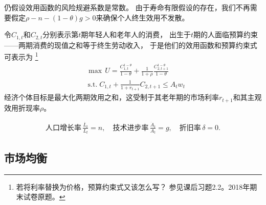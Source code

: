 \documentclass[cn,normal,11pt,black]{elegantnote}
\begin{document}
\begin{definition}[个人效用函数]
    仍假设效用函数的风险规避系数是常数。
    由于寿命有限假设的存在，我们不再需要假定$\rho - n - (1-\theta)g > 0$来确保个人终生效用不发散。
    
    令$C_{1,t}$和$C_{2,t}$分别表示第$t$期年轻人和老年人的消费，
    出生于$t$期的人面临预算约束——两期消费的现值之和等于终生劳动收入，
    于是他们的效用函数和预算约束式可表示为
    \footnote{若将利率替换为价格，预算约束式又该怎么写？ 参见课后习题2.2。2018年期末试卷原题。}
    \begin{align}
        & \max \, U = \frac{C_{1,t}^{1-\theta}}{1-\theta} + \frac{1}{1+\rho} \frac{C_{2, t+1}^{1-\theta}}{1-\theta}  \\ 
        & \, \mathrm{s.t.} \;  C_{1,t} + \frac{1}{1+r_{t+1}} C_{2,t+1} \le A_t w_t
    \end{align}   
    经济个体目标是最大化两期效用之和，这受制于其老年期的市场利率$r_{t+1}$和其主观效用折现率$\rho$。
\end{definition}

\begin{definition}[投入要素]
\begin{align}
    \mbox{人口增长率} \, \frac{\dot{L_t}}{L_t} = n, \quad
    \mbox{技术进步率} \, \frac{\dot{A}_t}{A_t} = g, \quad
    \mbox{折旧率} \, \delta = 0.
\end{align}
\end{definition}

\subsection{市场均衡}
\end{document}
